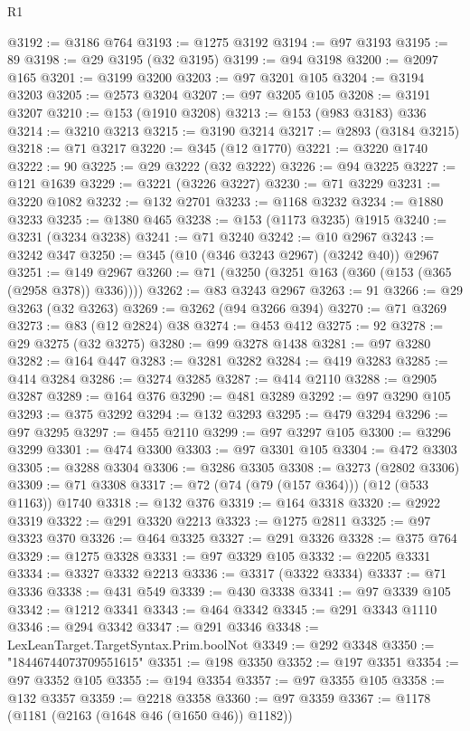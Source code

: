 \begin{lexlean}{R1}
\begin{coremodule}
{{{{{{{{{{{{{{{{{{{{{{{{{{{{{{{{{{{{{{{{{{{{{{{{{{{{{{{{{{{{{{{{{{{{{{{{{{{{{{{{{{{{{{{{{{{{{{{{{{{{{{{{{{{{{{{{{{{{{{{{{{{{{{{{{{{{{{{{{{{{{{{{{{{{{{{{{{{{{{{{{{{{{{{{{{{{{{{{{{{{{{{{{{@3192 := @3186 @764
@3193 := @1275 @3192
@3194 := @97 @3193
@3195 := 89
@3198 := @29 @3195 (@32 @3195)
@3199 := @94 @3198
@3200 := @2097 @165
@3201 := @3199 @3200
@3203 := @97 @3201 @105
@3204 := @3194 @3203
@3205 := @2573 @3204
@3207 := @97 @3205 @105
@3208 := @3191 @3207
@3210 := @153 (@1910 @3208)
@3213 := @153 (@983 @3183) @336
@3214 := @3210 @3213
@3215 := @3190 @3214
@3217 := @2893 (@3184 @3215)
@3218 := @71 @3217
@3220 := @345 (@12 @1770)
@3221 := @3220 @1740
@3222 := 90
@3225 := @29 @3222 (@32 @3222)
@3226 := @94 @3225
@3227 := @121 @1639
@3229 := @3221 (@3226 @3227)
@3230 := @71 @3229
@3231 := @3220 @1082
@3232 := @132 @2701
@3233 := @1168 @3232
@3234 := @1880 @3233
@3235 := @1380 @465
@3238 := @153 (@1173 @3235) @1915
@3240 := @3231 (@3234 @3238)
@3241 := @71 @3240
@3242 := @10 @2967
@3243 := @3242 @347
@3250 := @345 (@10 (@346 @3243 @2967) (@3242 @40)) @2967
@3251 := @149 @2967
@3260 := @71 (@3250 (@3251 @163 (@360 (@153 (@365 (@2958 @378)) @336))))
@3262 := @83 @3243 @2967
@3263 := 91
@3266 := @29 @3263 (@32 @3263)
@3269 := @3262 (@94 @3266 @394)
@3270 := @71 @3269
@3273 := @83 (@12 @2824) @38
@3274 := @453 @412
@3275 := 92
@3278 := @29 @3275 (@32 @3275)
@3280 := @99 @3278 @1438
@3281 := @97 @3280
@3282 := @164 @447
@3283 := @3281 @3282
@3284 := @419 @3283
@3285 := @414 @3284
@3286 := @3274 @3285
@3287 := @414 @2110
@3288 := @2905 @3287
@3289 := @164 @376
@3290 := @481 @3289
@3292 := @97 @3290 @105
@3293 := @375 @3292
@3294 := @132 @3293
@3295 := @479 @3294
@3296 := @97 @3295
@3297 := @455 @2110
@3299 := @97 @3297 @105
@3300 := @3296 @3299
@3301 := @474 @3300
@3303 := @97 @3301 @105
@3304 := @472 @3303
@3305 := @3288 @3304
@3306 := @3286 @3305
@3308 := @3273 (@2802 @3306)
@3309 := @71 @3308
@3317 := @72 (@74 (@79 (@157 @364))) (@12 (@533 @1163)) @1740
@3318 := @132 @376
@3319 := @164 @3318
@3320 := @2922 @3319
@3322 := @291 @3320 @2213
@3323 := @1275 @2811
@3325 := @97 @3323 @370
@3326 := @464 @3325
@3327 := @291 @3326
@3328 := @375 @764
@3329 := @1275 @3328
@3331 := @97 @3329 @105
@3332 := @2205 @3331
@3334 := @3327 @3332 @2213
@3336 := @3317 (@3322 @3334)
@3337 := @71 @3336
@3338 := @431 @549
@3339 := @430 @3338
@3341 := @97 @3339 @105
@3342 := @1212 @3341
@3343 := @464 @3342
@3345 := @291 @3343 @1110
@3346 := @294 @3342
@3347 := @291 @3346
@3348 := LexLeanTarget.TargetSyntax.Prim.boolNot
@3349 := @292 @3348
@3350 := "18446744073709551615"
@3351 := @198 @3350
@3352 := @197 @3351
@3354 := @97 @3352 @105
@3355 := @194 @3354
@3357 := @97 @3355 @105
@3358 := @132 @3357
@3359 := @2218 @3358
@3360 := @97 @3359
@3367 := @1178 (@1181 (@2163 (@1648 @46 (@1650 @46)) @1182))
}}}}}}}}}}}}}}}}}}}}}}}}}}}}}}}}}}}}}}}}}}}}}}}}}}}}}}}}}}}}}}}}}}}}}}}}}}}}}}}}}}}}}}}}}}}}}}}}}}}}}}}}}}}}}}}}}}}}}}}}}}}}}}}}}}}}}}}}}}}}}}}}}}}}}}}}}}}}}}}}}}}}}}}}}}}}}}}}}}}}}}}}}}
\end{coremodule}
\end{lexlean}
